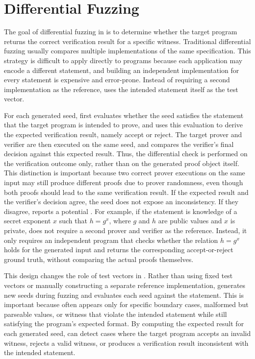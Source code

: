 \section{Differential Fuzzing}
\label{sec:greybox-differential}

The goal of differential fuzzing in \greyboxfuzz is to determine whether the target \zksnark program returns the correct verification result for a specific witness. Traditional differential fuzzing usually compares multiple implementations of the same specification. This strategy is difficult to apply directly to \zksnark programs because each application may encode a different statement, and building an independent \zksnark implementation for every statement is expensive and error-prone. Instead of requiring a second \zksnark implementation as the reference, \greyboxfuzz uses the intended statement itself as the test vector.

For each generated seed, \greyboxfuzz first evaluates whether the seed satisfies the statement that the target \zksnark program is intended to prove, and uses this evaluation to derive the expected verification result, namely accept or reject. The target prover and verifier are then executed on the same seed, and \greyboxfuzz compares the verifier's final decision against this expected result. Thus, the differential check is performed on the verification outcome only, rather than on the generated proof object itself. This distinction is important because two correct prover executions on the same input may still produce different proofs due to prover randomness, even though both proofs should lead to the same verification result. If the expected result and the verifier's decision agree, the seed does not expose an inconsistency. If they disagree, \greyboxfuzz reports a potential \logicerror. For example, if the statement is knowledge of a secret exponent $x$ such that $h = g^x$, where $g$ and $h$ are public values and $x$ is private, \greyboxfuzz does not require a second \zksnark prover and verifier as the reference. Instead, it only requires an independent program that checks whether the relation $h = g^x$ holds for the generated input and returns the corresponding accept-or-reject ground truth, without comparing the actual proofs themselves.

This design changes the role of test vectors in \greyboxfuzz. Rather than using fixed \zksnark test vectors or manually constructing a separate reference implementation, \greyboxfuzz generates new seeds during fuzzing and evaluates each seed against the statement. This is important because \logicerror often appears only for specific boundary cases, malformed but parseable values, or witness that violate the intended statement while still satisfying the program's expected format. By computing the expected result for each generated seed, \greyboxfuzz can detect cases where the target program accepts an invalid witness, rejects a valid witness, or produces a verification result inconsistent with the intended statement.

